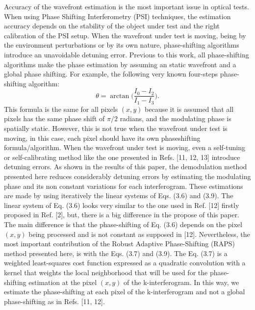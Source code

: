 Accuracy of the wavefront estimation is the most important issue in optical
tests. When using Phase Shifting Interferometry (PSI) techniques, the estimation
accuracy depends on the stability of the object under test and the right
calibration of the PSI setup. When the wavefront under test is moving, being by
the environment perturbations or by its own nature, phase-shifting algorithms
introduce an unavoidable detuning error. Previous to this work, all
phase-shifting algorithms make the phase estimation by assuming an static
wavefront and a global phase shifting. For example, the following very known
four-steps phase-shifting algorithm:
\begin{equation}
 \theta = \arctan \Bigg( \frac{I_0-I_2}{I_1-I_3} \Bigg).
\end{equation}
This formula is the same for all pixels $(x,y)$ because it is assumed that all
pixels has the same phase shift of $\pi/2$ radians, and the modulating phase is
spatially static. However, this is not true when the wavefront under test is
moving, in this case, each pixel should have its own phaseshifting
formula/algorithm. When the wavefront under test is moving, even a self-tuning
or self-calibrating method like the one presented in Refs. [11, 12, 13]
introduce detuning errors. As shown in the results of this paper, the
demodulation method presented here reduces considerably detuning errors by
estimating the modulating phase and its non constant variations for each
interferogram. These estimations are made by using iteratively the linear
systems of Eqs. (3.6) and (3.9). The linear system of Eq. (3.6) looks very
similar to the one used in Ref. [12] firstly proposed in Ref. [2], but, there is
a big difference in the propose of this paper. The main difference is that the
phase-shifting of Eq. (3.6) depends on the pixel $(x,y)$ being processed and
is not constant as supposed in [12]. Nevertheless, the most important
contribution of the Robust Adaptive Phase-Shifting (RAPS) method presented here,
is with the Eqs. (3.7) and (3.9). The Eq. (3.7) is a weighted least-squares cost
function expressed as a quadratic convolution with a kernel that weights the
local neighborhood that will be used for the phase-shifting estimation at the
pixel $(x,y)$ of the k-interferogram. In this way, we estimate the
phase-shifting at each pixel of the k-interferogram and not a global
phase-shifting as in Refs. [11, 12].

